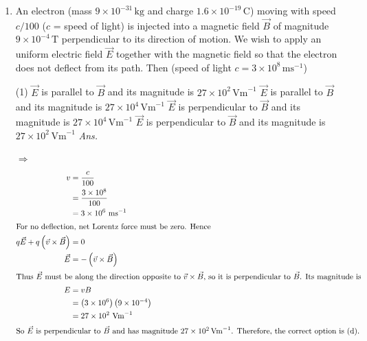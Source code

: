 \documentclass[preview, border={10mm, 5mm, 10mm, 10mm}]{standalone}
\title{\textsc{}}
\newcommand{\ans}{\textcolor{blue!20!red}{\textit{\quad Ans.}}}
\newenvironment{solution}{\par\noindent\color{red!80!black}$\Rightarrow$\enspace\ignorespaces}{\par}
\begin{document}
\begin{enumerate}[leftmargin=*]
\item An electron (mass $9 \times 10^{-31}\,\mathrm{kg}$ and charge $1.6 \times 10^{-19}\,\mathrm{C}$) moving with speed $c/100$ ($c$ = speed of light) is injected into a magnetic field $\vec{B}$ of magnitude $9 \times 10^{-4}\,\mathrm{T}$ perpendicular to its direction of motion. We wish to apply an uniform electric field $\vec{E}$ together with the magnetic field so that the electron does not deflect from its path. Then (speed of light $c = 3 \times 10^8\,\mathrm{m s}^{-1}$)
\begin{tasks}(1)
    \task $\vec{E}$ is parallel to $\vec{B}$ and its magnitude is $27 \times 10^2\,\mathrm{V m}^{-1}$
    \task $\vec{E}$ is parallel to $\vec{B}$ and its magnitude is $27 \times 10^4\,\mathrm{V m}^{-1}$
    \task $\vec{E}$ is perpendicular to $\vec{B}$ and its magnitude is $27 \times 10^4\,\mathrm{V m}^{-1}$
    \task $\vec{E}$ is perpendicular to $\vec{B}$ and its magnitude is $27 \times 10^2\,\mathrm{V m}^{-1}$ \ans
\end{tasks}
\begin{solution}
\begin{align*}
v &= \frac{c}{100} \\
  &= \frac{3 \times 10^8}{100} \\
  &= 3 \times 10^6 \ \mathrm{m s}^{-1} \\
\intertext{For no deflection, net Lorentz force must be zero. Hence}
q\vec{E} + q\left( \vec{v} \times \vec{B} \right) &= 0 \\
\vec{E} &= -\left( \vec{v} \times \vec{B} \right) \\
\intertext{Thus $\vec{E}$ must be along the direction opposite to $\vec{v} \times \vec{B}$, so it is perpendicular to $\vec{B}$. Its magnitude is}
E &= v B \\
  &= \left( 3 \times 10^6 \right)\left( 9 \times 10^{-4} \right) \\
  &= 27 \times 10^2 \ \mathrm{V m}^{-1} \\
\intertext{So $\vec{E}$ is perpendicular to $\vec{B}$ and has magnitude $27 \times 10^2\,\mathrm{V m}^{-1}$. Therefore, the correct option is (d).}
\end{align*}
\end{solution}


\end{enumerate}
\end{document}
